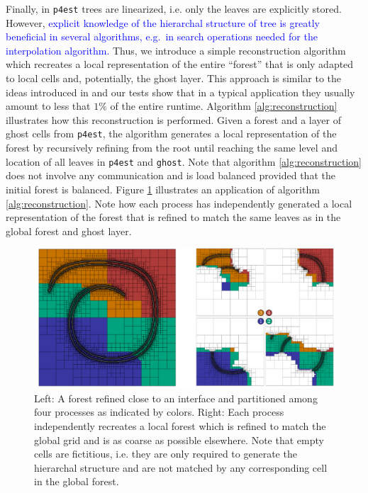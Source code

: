 Finally, in \texttt{p4est} trees are linearized, i.e. only the leaves are explicitly stored. However, \textcolor{blue}{explicit knowledge of the hierarchal structure of tree is greatly beneficial in several algorithms, e.g.\ in search operations needed for the interpolation algorithm.} Thus, we introduce a simple reconstruction algorithm which recreates a local representation of the entire ``forest'' that is only adapted to local cells and, potentially, the ghost layer. This approach is similar to the ideas introduced in \cite{Bangerth;Burstedde;Heister;etal:11:Algorithms-and-data-} and our tests show that in a typical application they usually amount to less that $1\%$ of the entire runtime. Algorithm \ref{alg:reconstruction} illustrates how this reconstruction is performed. Given a forest and a layer of ghost cells from \texttt{p4est}, the algorithm generates a local representation of the forest by recursively refining from the root until reaching the same level and location of all leaves in \texttt{p4est} and \texttt{ghost}. Note that algorithm \ref{alg:reconstruction} does not involve any communication and is load balanced provided that the initial forest is balanced. Figure \ref{fig:reconstruction} illustrates an application of algorithm \ref{alg:reconstruction}. Note how each process has independently generated a local representation of the forest that is refined to match the same leaves as in the global forest and ghost layer.
\begin{figure}[htbp]
\begin{center}
\includegraphics[width = \textwidth]{figures/reconstruct.pdf}
\end{center}
\caption{Left: A forest refined close to an interface and partitioned among four processes as indicated by colors. Right: Each process independently recreates a local forest which is refined to match the global grid and is as coarse as possible elsewhere. Note that empty cells are fictitious, i.e. they are only required to generate the hierarchal structure and are not matched by any corresponding cell in the global forest.}
\label{fig:reconstruction}
\end{figure}
